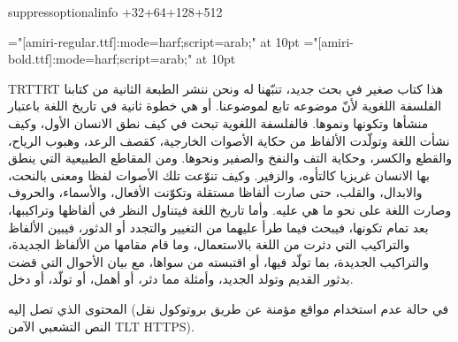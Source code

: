 \pdfvariable suppressoptionalinfo +32+64+128+512\relax




\def\mode{mode=node}
\def\mode{mode=harf}

\font\amiriten="[amiri-regular.ttf]:\mode;script=arab;" at 10pt
\font\amiritenb="[amiri-bold.ttf]:\mode;script=arab;" at 10pt

\begingroup\pardir TRT\textdir TRT
\amiriten
هذا كتاب صغير في بحث جديد، تنبّهنا له ونحن ننشر الطبعة الثانية من كتابنا الفلسفة
اللغوية لأنّ موضوعه تابع لموضوعنا. أو هي خطوة ثانية في تاريخ اللغة باعتبار
منشأها وتكونها ونموها. فالفلسفة اللغوية تبحث في كيف نطق الانسان الأول، وكيف
نشأت اللغة وتولّدت الألفاظ من حكاية الأصوات الخارجية، ك{\amiritenb قصف الرعد}، وهبوب الرياح،
والقطع والكسر، وحكاية التف والنفخ والصفير ونحوها. ومن المقاطع الطبيعية التي
ينطق بها الانسان غريزيا كالتأوه، والزفير. وكيف تنوّعت تلك الأصوات لفظا ومعنى
بالنحت، والابدال، والقلب، حتى صارت ألفاظا مستقلة وتكوّنت الأفعال، والأسماء،
والحروف وصارت اللغة على نحو ما هي عليه.  وأما تاريخ اللغة فيتناول النظر في
ألفاظها وتراكيبها، بعد تمام تكونها، فيبحث فيما طرأ عليهما من التغيير والتجدد أو
الدثور، فيبين الألفاظ والتراكيب التي دثرت من اللغة بالاستعمال، وما قام مقامها
من الألفاظ الجديدة، والتراكيب الجديدة، بما تولّد فيها، أو اقتبسته من سواها، مع
بيان الأحوال التي قضت بدثور القديم وتولد الجديد، وأمثلة مما دثر، أو أهمل، أو
تولّد، أو دخل.

المحتوى الذي تصل إليه (في حالة عدم استخدام مواقع مؤمنة عن طريق بروتوكول نقل
النص التشعبي الآمن {\textdir TLT HTTPS}).
\par\endgroup\vfill\eject

\def\arabictext{%
هذا كتاب صغير في بحث جديد، تنبّهنا له ونحن ننشر الطبعة الثانية من كتابنا الفلسفة
اللغوية لأنّ موضوعه تابع لموضوعنا. أو هي خطوة ثانية في تاريخ اللغة باعتبار
منشأها وتكونها ونموها. فالفلسفة اللغوية تبحث في كيف نطق الانسان الأول، وكيف
نشأت اللغة وتولّدت الألفاظ من حكاية الأصوات الخارجية، كقصف الرعد، وهبوب الرياح،
والقطع والكسر، وحكاية التف والنفخ والصفير ونحوها. ومن المقاطع الطبيعية التي
ينطق بها الانسان غريزيا كالتأوه، والزفير. وكيف تنوّعت تلك الأصوات لفظا ومعنى
بالنحت، والابدال، والقلب، حتى صارت ألفاظا مستقلة وتكوّنت الأفعال، والأسماء،
والحروف وصارت اللغة على نحو ما هي عليه.  وأما تاريخ اللغة فيتناول النظر في
ألفاظها وتراكيبها، بعد تمام تكونها، فيبحث فيما طرأ عليهما من التغيير والتجدد أو
الدثور، فيبين الألفاظ والتراكيب التي دثرت من اللغة بالاستعمال، وما قام مقامها
من الألفاظ الجديدة، والتراكيب الجديدة، بما تولّد فيها، أو اقتبسته من سواها، مع
بيان الأحوال التي قضت بدثور القديم وتولد الجديد، وأمثلة مما دثر، أو أهمل، أو
تولّد، أو دخل.%
}

